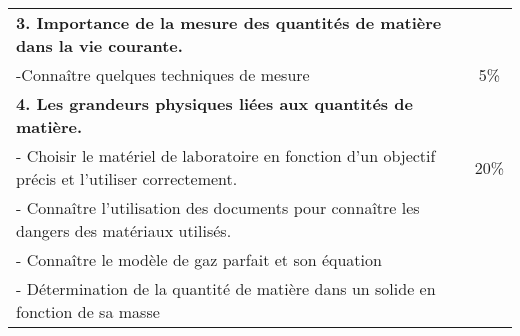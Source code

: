 \documentclass[12pt]{article}
\begin{document}
\begin{center}
\begin{tabular}{|M{11cm}||c|}
    \hline
    \bf{3. Importance de la mesure des quantités de matière dans la vie courante. }&\\
        -{Connaître quelques techniques de mesure }&{5\%}\\
     \hline
     \bf{4. Les grandeurs physiques liées aux quantités de matière. }&\\
        - {Choisir le matériel de laboratoire en fonction d'un objectif précis et l'utiliser correctement.}&{20\%}\\
         -{ Connaître l'utilisation des documents pour connaître les dangers des matériaux utilisés. }&\\
         -{  Connaître le modèle de gaz parfait et son équation}&\\
         -{  Détermination de la quantité de matière dans un solide en fonction de sa masse}&\\
\hline
\end{tabular} 
\end{center}
\vspace{4cm}
\end{document}
